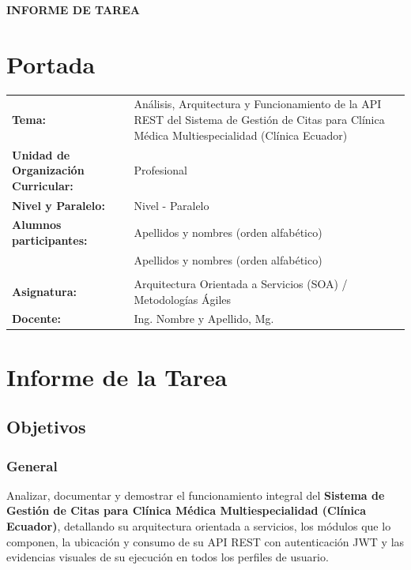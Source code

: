 \documentclass{article}
\begin{document}
\begin{center}
    {\large \textbf{INFORME DE TAREA}} \\
\end{center}

\section{Portada}
\begin{flushleft}
\begin{tabular}{ l p{9.5cm} }
    \textbf{Tema:} & Análisis, Arquitectura y Funcionamiento de la API REST del Sistema de Gestión de Citas para Clínica Médica Multiespecialidad (Clínica Ecuador) \\
    \textbf{Unidad de Organización Curricular:} & Profesional \\
    \textbf{Nivel y Paralelo:} & Nivel - Paralelo \\
    \textbf{Alumnos participantes:} & Apellidos y nombres (orden alfabético) \\
    & Apellidos y nombres (orden alfabético) \\
    & \dotfill \\
    \textbf{Asignatura:} & Arquitectura Orientada a Servicios (SOA) / Metodologías Ágiles \\
    \textbf{Docente:} & Ing. Nombre y Apellido, Mg. \\
\end{tabular}
\end{flushleft}


\section{Informe de la Tarea}
\subsection{Objetivos}
\subsubsection{General}
Analizar, documentar y demostrar el funcionamiento integral del \textbf{Sistema de Gestión de Citas para Clínica Médica Multiespecialidad (Clínica Ecuador)}, detallando su arquitectura orientada a servicios, los módulos que lo componen, la ubicación y consumo de su API REST con autenticación JWT y las evidencias visuales de su ejecución en todos los perfiles de usuario.
\end{document}
